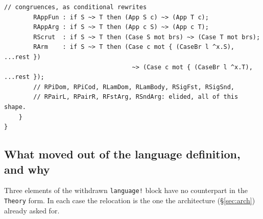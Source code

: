 \documentclass[11pt]{article}
\begin{document}
\begin{lstlisting}[language=mettail]
        // congruences, as conditional rewrites
        RAppFun : if S ~> T then (App S c) ~> (App T c);
        RAppArg : if S ~> T then (App c S) ~> (App c T);
        RScrut  : if S ~> T then (Case S mot brs) ~> (Case T mot brs);
        RArm    : if S ~> T then (Case c mot { (CaseBr l ^x.S), ...rest })
                                   ~> (Case c mot { (CaseBr l ^x.T), ...rest });
        // RPiDom, RPiCod, RLamDom, RLamBody, RSigFst, RSigSnd,
        // RPairL, RPairR, RFstArg, RSndArg: elided, all of this shape.
    }
}
\end{lstlisting}

\subsection{What moved out of the language definition, and why}\label{sec:whatmoved}
Three elements of the withdrawn \lstinline[language=mettail,basicstyle=\ttfamily\small]|language!|
block have no counterpart in the \texttt{Theory} form. In each case the relocation is the one the
architecture (\S\ref{sec:arch}) already asked for.
\end{document}
